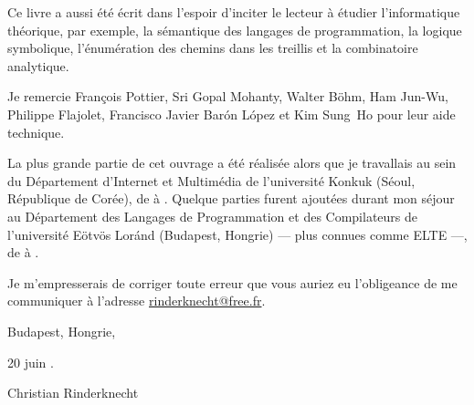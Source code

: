 Ce livre a aussi été écrit dans l'espoir d'inciter le lecteur à
étudier l'informatique théorique, par exemple, la sémantique des
langages de programmation, la logique symbolique, l'énumération des
chemins dans les treillis et la combinatoire analytique.

Je remercie Fran\c{c}ois Pottier, Sri Gopal Mohanty, Walter B\"ohm,
Ham Jun-Wu, Philippe Flajolet, Francisco Javier Bar\'on L\'opez et\!
Kim Sung~Ho pour leur aide technique.

La plus grande partie de cet ouvrage a été réalisée alors que je
travallais au sein du Département d'Internet et Multimédia de
l'université Konkuk (Séoul, République de Corée), de
 à . Quelque parties furent
ajoutées durant mon séjour au Département des Langages de
Programmation et des Compilateurs de l'université E\"otv\"os Lor\'and
(Budapest, Hongrie) --- plus connues comme ELTE ---, de
 à .

Je m'empresserais de corriger toute erreur que vous auriez eu
l'obligeance de me communiquer à l'adresse \url{rinderknecht@free.fr}.

\bigskip

\hfill{}Budapest, Hongrie,

\hfill 20 juin .

\bigskip

\hfill{}Christian Rinderknecht
